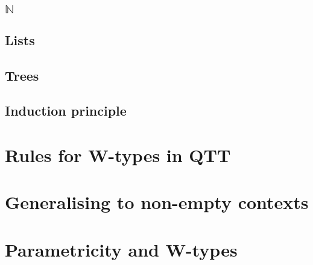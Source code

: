 \documentclass[12pt,a4paper]{article}
\begin{document}
\subsection{$\mathbb{N}$}
\subsection{Lists}
\subsection{Trees}

\subsection{Induction principle}

\section{Rules for W-types in QTT}
\section{Generalising to non-empty contexts}
\section{Parametricity and W-types}
\end{document}
